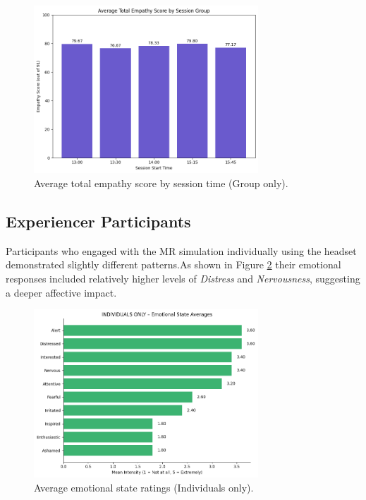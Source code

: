 \begin{figure}[htbp]
    \centering
    \includegraphics[width=0.75\textwidth]{../../Figures/post-session-grp-empathy.png}
    \caption{Average total empathy score by session time (Group only).}
    \label{fig:empathy_group_sessions}
\end{figure}


\subsection{Experiencer Participants}

Participants who engaged with the MR simulation individually using the headset demonstrated slightly different patterns.As shown in Figure \ref{fig:emotional_post_indiv} their emotional responses included relatively higher levels of \textit{Distress} and \textit{Nervousness}, suggesting a deeper affective impact.

\begin{figure}[H]
    \centering
    \includegraphics[width=0.75\textwidth]{../../Figures/emotional-post-indiv.png}
    \caption{Average emotional state ratings (Individuals only).}
    \label{fig:emotional_post_indiv}
\end{figure}


